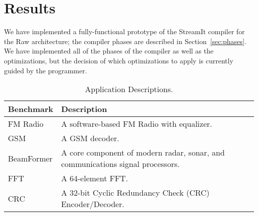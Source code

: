 \section{Results}
\label{sec:results}

We have implemented a fully-functional prototype of the StreamIt
compiler for the Raw architecture; the compiler phases are described
in Section~\ref{sec:phases}.  We have implemented all of the phases of
the compiler as well as the optimizations, but the decision of which
optimizations to apply is currently guided by the programmer.

\begin{table}[t]
\begin{center}
\scriptsize
\begin{tabular}{|l|l|} \hline
{\bf Benchmark} & {\bf Description}\\
\hline \hline
FM Radio & A software-based FM Radio with equalizer.\\
\hline
GSM & A GSM decoder.\\
\hline
BeamFormer & A core component of modern radar, sonar, and communications signal processors. \cite{pca}\\
\hline
FFT & A 64-element FFT. \\
\hline
CRC & A 32-bit Cyclic Redundancy Check (CRC) Encoder/Decoder. \\
\hline
\end{tabular}
\vspace{-6pt}
\caption{\protect\small Application Descriptions.}
\label{tab:benchmarks}
\vspace{-12pt}
\end{center}
\end{table}

%
%
%


